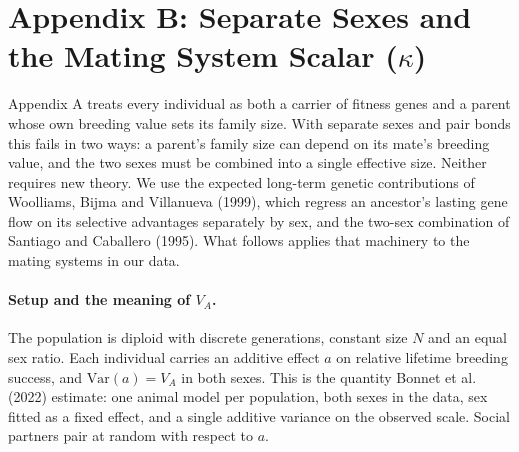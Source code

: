 \documentclass[12pt]{article}
\begin{document}
\section{Appendix B: Separate Sexes and the Mating System Scalar ($\kappa$)}

Appendix A treats every individual as both a carrier of fitness genes and a parent whose own breeding value sets its family size. With separate sexes and pair bonds this fails in two ways: a parent's family size can depend on its mate's breeding value, and the two sexes must be combined into a single effective size. Neither requires new theory. We use the expected long-term genetic contributions of Woolliams, Bijma and Villanueva (1999), which regress an ancestor's lasting gene flow on its selective advantages separately by sex, and the two-sex combination of Santiago and Caballero (1995). What follows applies that machinery to the mating systems in our data.

\paragraph{Setup and the meaning of $V_A$.} The population is diploid with discrete generations, constant size $N$ and an equal sex ratio. Each individual carries an additive effect $a$ on relative lifetime breeding success, and $\mathrm{Var}(a) = V_A$ in both sexes. This is the quantity Bonnet et al. (2022) estimate: one animal model per population, both sexes in the data, sex fitted as a fixed effect, and a single additive variance on the observed scale. Social partners pair at random with respect to $a$.
\end{document}
